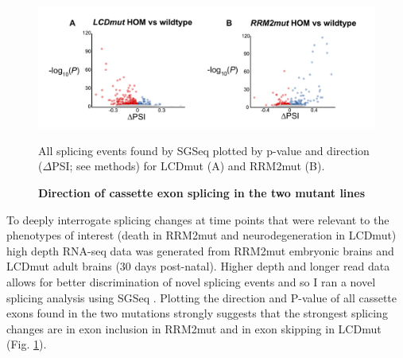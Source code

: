 \begin{figure}[h]
	\centering
	\includegraphics[width=\textwidth]{Figures/05_tdp_mice/transcriptome_scatters.png}
	\caption{\textbf{Direction of cassette exon splicing in the two mutant lines}}
	All splicing events found by SGSeq plotted by p-value and direction ($\Delta$PSI; see methods) for LCDmut (A) and RRM2mut (B).
	\label{fig:cassette_scatters}
\end{figure}

To deeply interrogate splicing changes at time points that were relevant to the phenotypes of interest (death in RRM2mut and neurodegeneration in LCDmut) high depth RNA-seq data was generated from RRM2mut embryonic brains and LCDmut adult brains (30 days post-natal). 
Higher depth and longer read data allows for better discrimination of novel splicing events and so I ran a novel splicing analysis using SGSeq \citep{Goldstein2016}. 
Plotting the direction and P-value of all cassette exons found in the two mutations strongly suggests that the strongest splicing changes are in exon inclusion in RRM2mut and in exon skipping in LCDmut (Fig. \ref{fig:cassette_scatters}).


